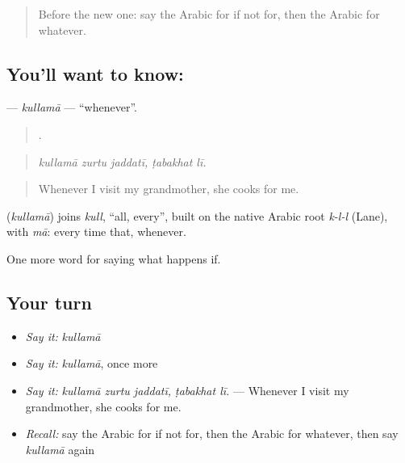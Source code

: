 \label{lesson:AR-C400-kullama}



\begin{quote}
Before the new one: say the Arabic for if not for, then the Arabic for whatever.
\end{quote}

\subsection*{You'll want to know: }
\textbf{} — \emph{kullamā} — \textquotedblleft{}whenever\textquotedblright{}.

\begin{quote}
    .
\end{quote}

\begin{quote}
\emph{kullamā zurtu jaddatī, ṭabakhat lī.}
\end{quote}

\begin{quote}
Whenever I visit my grandmother, she cooks for me.
\end{quote}

\begin{cousinweb}
\textbf{} (\emph{kullamā}) joins \emph{kull}, \textquotedblleft{}all, every\textquotedblright{}, built on the native Arabic root \emph{k-l-l} (Lane), with \emph{mā}: every time that, whenever.
\end{cousinweb}

\begin{grammarlens}[title={What you've built}]
One more word for saying what happens if.
\end{grammarlens}

\subsection*{Your turn}
\begin{itemize}
\raggedright
  \item \emph{Say it:} \emph{kullamā}
  \item \emph{Say it:} \emph{kullamā}, once more
  \item \emph{Say it:} \emph{kullamā zurtu jaddatī, ṭabakhat lī.} — Whenever I visit my grandmother, she cooks for me.
  \item \emph{Recall:} say the Arabic for if not for, then the Arabic for whatever, then say \emph{kullamā} again
\end{itemize}

